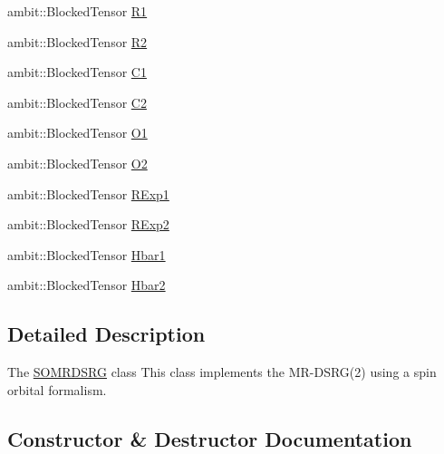\begin{DoxyCompactItemize}
\item 
ambit\+::\+Blocked\+Tensor \mbox{\hyperlink{classforte_1_1_s_o_m_r_d_s_r_g_aa09fd106a2e24736dcfbf04aea2d440c}{R1}}
\item 
ambit\+::\+Blocked\+Tensor \mbox{\hyperlink{classforte_1_1_s_o_m_r_d_s_r_g_a0a1bd739982a593062f7ead2e8dbe015}{R2}}
\item 
ambit\+::\+Blocked\+Tensor \mbox{\hyperlink{classforte_1_1_s_o_m_r_d_s_r_g_a7840b54615cff6628f9e105211b1b982}{C1}}
\item 
ambit\+::\+Blocked\+Tensor \mbox{\hyperlink{classforte_1_1_s_o_m_r_d_s_r_g_ae1495f30246f8fc62930948224fb70bb}{C2}}
\item 
ambit\+::\+Blocked\+Tensor \mbox{\hyperlink{classforte_1_1_s_o_m_r_d_s_r_g_a2328537c4268f788fa4a6ab068cc5792}{O1}}
\item 
ambit\+::\+Blocked\+Tensor \mbox{\hyperlink{classforte_1_1_s_o_m_r_d_s_r_g_a1a2ca210fe52cc6a7f8d07dc400bc5f6}{O2}}
\item 
ambit\+::\+Blocked\+Tensor \mbox{\hyperlink{classforte_1_1_s_o_m_r_d_s_r_g_afaabb93c0bcceef25e574e9f42f8a9d4}{R\+Exp1}}
\item 
ambit\+::\+Blocked\+Tensor \mbox{\hyperlink{classforte_1_1_s_o_m_r_d_s_r_g_a2548f348dd9a30362c19af46dbc5a890}{R\+Exp2}}
\item 
ambit\+::\+Blocked\+Tensor \mbox{\hyperlink{classforte_1_1_s_o_m_r_d_s_r_g_a0893698e950dc9c4f4f841247d588829}{Hbar1}}
\item 
ambit\+::\+Blocked\+Tensor \mbox{\hyperlink{classforte_1_1_s_o_m_r_d_s_r_g_a74bbbb9baf53692232edb7ecc59a3859}{Hbar2}}
\end{DoxyCompactItemize}


\subsection{Detailed Description}
The \mbox{\hyperlink{classforte_1_1_s_o_m_r_d_s_r_g}{S\+O\+M\+R\+D\+S\+RG}} class This class implements the M\+R-\/\+D\+S\+RG(2) using a spin orbital formalism. 

\subsection{Constructor \& Destructor Documentation}
\mbox{\label{classforte_1_1_s_o_m_r_d_s_r_g_adf536e2ff08708e0a9d20670db58703a}} 
